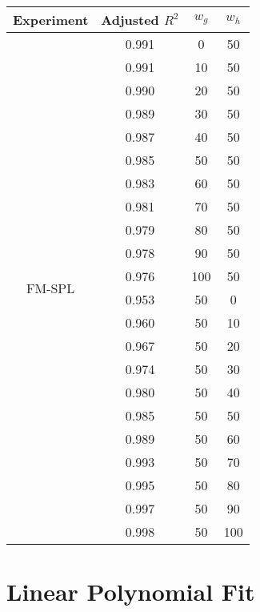 \documentclass{article}
\begin{document}
\begin{table}[h]
  \centering
  \begin{tabular}{c c c c}
    \toprule
    Experiment                & Adjusted $R^2$ & $w_g$ & $w_h$ \\
    \midrule
    \multirow{22}{*}{FM-SPL}  & 0.991 & 0 & 50 \\
                              & 0.991 & 10  & 50 \\
                              & 0.990 & 20  & 50 \\
                              & 0.989 & 30  & 50 \\
                              & 0.987 & 40  & 50 \\
                              & 0.985 & 50  & 50 \\
                              & 0.983 & 60  & 50 \\
                              & 0.981 & 70  & 50 \\
                              & 0.979 & 80  & 50 \\
                              & 0.978 & 90  & 50 \\
                              & 0.976 & 100 & 50 \\
                              & 0.953 & 50  & 0 \\
                              & 0.960 & 50  & 10 \\
                              & 0.967 & 50  & 20 \\
                              & 0.974 & 50  & 30 \\
                              & 0.980 & 50  & 40 \\
                              & 0.985 & 50  & 50 \\
                              & 0.989 & 50  & 60 \\
                              & 0.993 & 50  & 70 \\
                              & 0.995 & 50  & 80 \\
                              & 0.997 & 50  & 90 \\
                              & 0.998 & 50  & 100 \\
    \bottomrule
  \end{tabular}
\end{table}

\clearpage



\section{Linear Polynomial Fit} %
\label{sec:linear_polynomial_fit}
\end{document}
